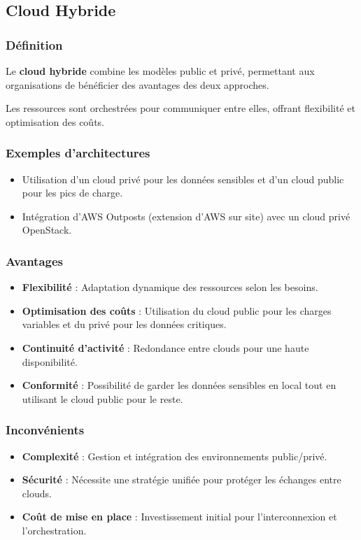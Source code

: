 \documentclass{rapportClass} %
\begin{document}
\subsection{Cloud Hybride}

\subsubsection{Définition}
Le \textbf{cloud hybride} combine les modèles public et privé,
permettant aux organisations de bénéficier des avantages des deux
approches.

Les ressources sont orchestrées pour communiquer entre elles, offrant
flexibilité et optimisation des coûts.

\subsubsection{Exemples d’architectures}
\begin{itemize}
    \item Utilisation d’un cloud privé pour les données sensibles et d’un cloud public pour les pics de charge.
    \item Intégration d’AWS Outposts (extension d’AWS sur site) avec un cloud privé OpenStack.
\end{itemize}

\subsubsection{Avantages}
\begin{itemize}
    \item \textbf{Flexibilité} : Adaptation dynamique des ressources selon les besoins.
    \item \textbf{Optimisation des coûts} : Utilisation du cloud public pour les charges variables et du privé pour les données critiques.
    \item \textbf{Continuité d’activité} : Redondance entre clouds pour une haute disponibilité.
    \item \textbf{Conformité} : Possibilité de garder les données sensibles en local tout en utilisant le cloud public pour le reste.
\end{itemize}

\subsubsection{Inconvénients}
\begin{itemize}
    \item \textbf{Complexité} : Gestion et intégration des environnements public/privé.
    \item \textbf{Sécurité} : Nécessite une stratégie unifiée pour protéger les échanges entre clouds.
    \item \textbf{Coût de mise en place} : Investissement initial pour l’interconnexion et l’orchestration.
\end{itemize}
\end{document}
